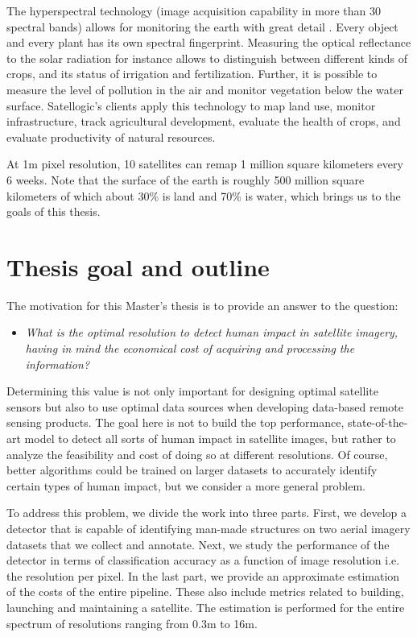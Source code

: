 The hyperspectral technology (image acquisition capability in more than 30 spectral bands) allows for monitoring the earth with great detail \parencite{satellogic2019}. Every object and every plant has its own spectral fingerprint. Measuring the optical reflectance to the solar radiation for instance allows to distinguish between different kinds of crops, and its status of irrigation and fertilization. Further, it is possible to measure the level of pollution in the air and monitor vegetation below the water surface. Satellogic's clients apply this technology to map land use, monitor infrastructure, track agricultural development, evaluate the health of crops, and evaluate productivity of natural resources.

At 1m pixel resolution, 10 satellites can remap 1 million square kilometers every 6 weeks. Note that the surface of the earth is roughly 500 million square kilometers of which about 30\% is land and 70\% is water, which brings us to the goals of this thesis.

\section{Thesis goal and outline}

The motivation for this Master's thesis is to provide an answer to the question:
\begin{itemize}
	\item[] \textit{What is the optimal resolution to detect human impact in satellite imagery, having in mind the economical cost of acquiring and processing the information?} 
\end{itemize}
Determining this value is not only important for designing optimal satellite sensors but also to use optimal data sources when developing data-based remote sensing products. The goal here is not to build the top performance, state-of-the-art model to detect all sorts of human impact in satellite images, but rather to analyze the feasibility and cost of doing so at different resolutions. Of course, better algorithms could be trained on larger datasets to accurately identify certain types of human impact, but we consider a more general problem.

To address this problem, we divide the work into three parts. First, we develop a detector that is capable of identifying man-made structures on two aerial imagery datasets that we collect and annotate. Next, we study the performance of the detector in terms of classification accuracy as a function of image resolution i.e. the resolution per pixel. In the last part, we provide an approximate estimation of the costs of the entire pipeline. These also include metrics related to building, launching and maintaining a satellite. The estimation is performed for the entire spectrum of resolutions ranging from 0.3m to 16m.

